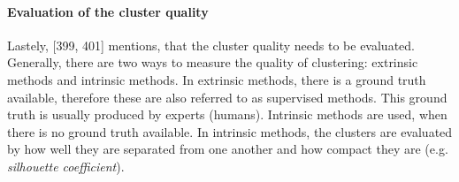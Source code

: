   \paragraph{Evaluation of the cluster quality}
  Lastely, \textcite{han2011data}[399, 401] mentions, that the cluster quality needs to be evaluated. Generally, there are two ways to measure the quality of clustering: extrinsic methods and intrinsic methods. In extrinsic methods, there is a ground truth available, therefore these are also referred to as supervised methods. This ground truth is usually produced by experts (humans). Intrinsic methods are used, when there is no ground truth available. In intrinsic methods, the clusters are evaluated by how well they are separated from one another and how compact they are (e.g. \textit{silhouette coefficient}).

